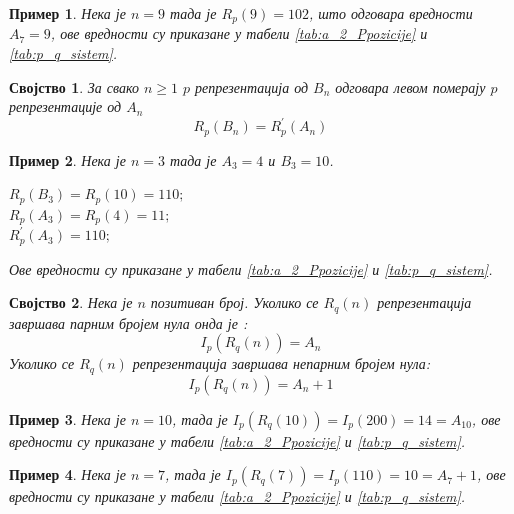 \documentclass[a4paper]{article}
\newtheorem{example}{Пример}
\newtheorem{property}{Својство}
\begin{document}
\begin{example}
	Нека је $ n = 9 $ тада је $ R_{p}(9) = 102 $, што одговара вредности $ A_{7} = 9 $, ове вредности су приказане у табели \ref{tab:a_2_Ppozicije} и \ref{tab:p_q_sistem}.
\end{example}

\begin{property}
	\label{prop:levi_pomeraj}
	За свако $ n \geq 1 $ $ p $ репрезентација од $ B_{n} $ одговара левом померају $ p $ репрезентације од  $ A_{n} $
		\begin{displaymath}
			R_{p} (B_{n}) = R_{p}^{'} (A_{n}) 
		\end{displaymath}
\end{property}

\begin{example}
	Нека је $ n = 3 $ тада је $ A_{3} = 4 $ и $ B_{3} = 10 $.
	\begin{center}
		$ R_{p}(B_{3}) = R_{p}(10) = 110; $ \\
		$ R_{p}(A_{3}) = R_{p}(4) = 11; $ \\
		$ R_{p}^{'}(A_{3}) = 110; $ 
	\end{center}
	Ове вредности су приказане у табели \ref{tab:a_2_Ppozicije} и \ref{tab:p_q_sistem}.
\end{example}

\begin{property}
	\label{prop:r_q_nule}
	Нека је $ n $ позитиван број. Уколико се $ R_q(n) $ репрезентација завршава парним бројем нула онда је :
	\begin{displaymath}
		I_{p}(R_q(n)) = A_{n}
	\end{displaymath}
	Уколико се $ R_q(n) $ репрезентација завршава непарним бројем нула: 
	\begin{displaymath}
		I_{p}(R_q(n)) = A_{n} + 1
	\end{displaymath}
\end{property}

\begin{example}
	Нека је $ n = 10 $, тада је $ I_{p}(R_q(10)) = I_{p}(200) = 14 = A_{10} $, ове вредности су приказане у табели \ref{tab:a_2_Ppozicije} и \ref{tab:p_q_sistem}.
\end{example}

\begin{example}
	Нека је $ n = 7 $, тада је $ I_{p}(R_q(7)) = I_{p}(110) = 10 = A_{7} + 1 $, ове вредности су приказане у табели \ref{tab:a_2_Ppozicije} и \ref{tab:p_q_sistem}.
\end{example}
\end{document}

